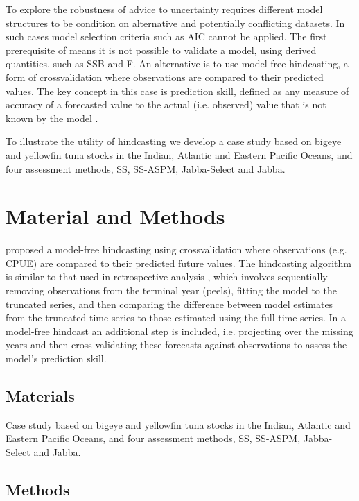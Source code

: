 \documentclass[a4paper]{article}
\begin{document}
To explore the robustness of advice to uncertainty requires different model structures to be condition on alternative and potentially conflicting datasets. In such cases model selection criteria such as AIC cannot be applied. The first prerequisite of \cite{hodge} means it is not possible to validate a model, using derived quantities, such as SSB and F. An alternative is to use model-free hindcasting, a form of crossvalidation where observations are compared to their predicted values. The key concept in this case is prediction skill, defined as any measure of accuracy of a forecasted value to the actual (i.e. observed) value that is not known by the model \cite{Huschke1959}.

To illustrate the utility of hindcasting we develop a case study based on bigeye and yellowfin tuna stocks in the Indian, Atlantic and Eastern Pacific Oceans, and four assessment methods, SS, SS-ASPM, Jabba-Select and Jabba. 

\section{Material and Methods}

\cite{kell2016xval} proposed a model-free hindcasting using crossvalidation where observations (e.g. CPUE) are compared to their predicted future values. The hindcasting algorithm is similar to that used in retrospective analysis \citep{Hurtado2014, carvalho}, which involves sequentially removing  observations from the terminal year (peels), fitting the model to the truncated series, and then comparing the difference between model estimates from the truncated time-series to those estimated using the full time series. In a model-free hindcast an additional step is included, i.e. projecting over the missing years and then cross-validating these forecasts against observations to assess the model’s prediction skill.

\subsection{Materials}

Case study based on bigeye and yellowfin tuna stocks in the Indian, Atlantic and Eastern Pacific Oceans, and four assessment methods, SS, SS-ASPM, Jabba-Select and Jabba. 

\subsection{Methods}
\end{document}
